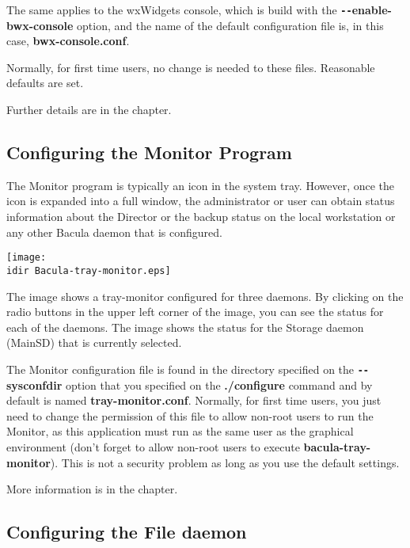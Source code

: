 The same applies to the wxWidgets console, which is build with the {\bf
\verb:--:enable-bwx-console} option, and the name of the default
configuration file is, in this case, {\bf bwx-console.conf}.

Normally, for first time users, no change is needed to these files. Reasonable
defaults are set. 

Further details are in the
 chapter.

\subsection{Configuring the Monitor Program}

The Monitor program is typically an icon in the system tray. However, once the
icon is expanded into a full window, the administrator or user can obtain
status information about the Director or the backup status on the local
workstation or any other Bacula daemon that is configured. 

\texttt{[image: \\idir Bacula-tray-monitor.eps]} 

The image shows a tray-monitor configured for three daemons. By clicking on
the radio buttons in the upper left corner of the image, you can see the
status for each of the daemons. The image shows the status for the Storage
daemon (MainSD) that is currently selected. 

The Monitor configuration file is found in the directory specified on the {\bf
\verb:--:sysconfdir} option that you specified on the {\bf ./configure} command
and
by default is named {\bf tray-monitor.conf}. Normally, for first time users,
you just need to change the permission of this file to allow non-root users to
run the Monitor, as this application must run as the same user as the
graphical environment (don't forget to allow non-root users to execute {\bf
bacula-tray-monitor}). This is not a security problem as long as you use the
default settings. 

More information is in the
 chapter.

\subsection{Configuring the File daemon}

